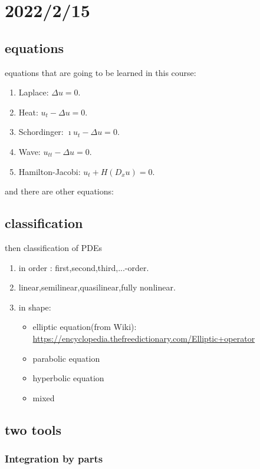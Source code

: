 \section{2022/2/15}

\subsection{equations}
equations that are going to be learned in this course:
\begin{enumerate}
    \item Laplace: $\Delta u=0$.
    \item Heat: $u_t-\Delta u=0$.
    \item Schordinger: $\imath u_t -\Delta u=0$.
    \item Wave: $u_{tt} -\Delta u=0$.
    \item Hamilton-Jacobi: $u_t + H(D_x u)=0$.     
\end{enumerate}

and there are other equations:



\subsection{classification}

then classification of PDEs

\begin{enumerate}
    \item in order : first,second,third,...-order.
    \item linear,semilinear,quasilinear,fully nonlinear.
    \item in shape:
        \begin{itemize}
            \item elliptic equation(from Wiki):
            \url{https://encyclopedia.thefreedictionary.com/Elliptic+operator}
            \item parabolic equation
            \item hyperbolic equation
            \item mixed
        \end{itemize}
\end{enumerate}

\subsection{two tools}

\subsubsection{Integration by parts}


